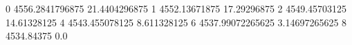 0 4556.2841796875 21.4404296875
1 4552.13671875 17.29296875
2 4549.45703125 14.61328125
4 4543.455078125 8.611328125
6 4537.99072265625 3.14697265625
8 4534.84375 0.0
